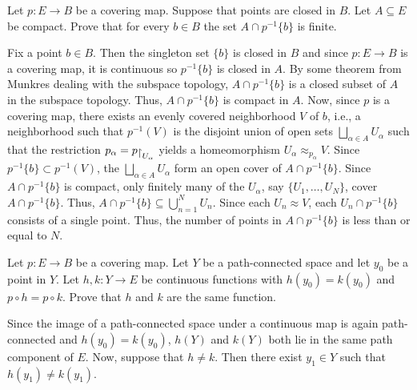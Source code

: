 \begin{problem}
  Let \(p\colon E\to B\) be a covering map. Suppose that points are closed
  in \(B\). Let \(A\subseteq E\) be compact. Prove that for every
  \(b\in B\) the set \(A\cap p^{-1}\{b\}\) is finite.
\end{problem}
\begin{solution}
  Fix a point \(b\in B\). Then the singleton set \(\{b\}\) is closed in
  \(B\) and since \(p\colon E\to B\) is a covering map, it is continuous so
  \(p^{-1}\{b\}\) is closed in \(A\). By some theorem from Munkres dealing
  with the subspace topology, \(A\cap p^{-1}\{b\}\) is a closed subset of
  \(A\) in the subspace topology. Thus, \(A\cap p^{-1}\{b\}\) is compact in
  \(A\). Now, since \(p\) is a covering map, there exists an evenly covered
  neighborhood \(V\) of \(b\), i.e., a neighborhood such that \(p^{-1}(V)\)
  is the disjoint union of open sets \(\bigsqcup_{\alpha\in A} U_\alpha\)
  such that the restriction \(p_\alpha=p\restrict{U_\alpha}\) yields a
  homeomorphism \(U_\alpha\approx_{p_\alpha} V\). Since
  \(p^{-1}\{b\}\subset p^{-1}(V)\), the \(\bigsqcup_{\alpha\in A}U_\alpha\)
  form an open cover of \(A\cap p^{-1}\{b\}\). Since \(A\cap p^{-1}\{b\}\)
  is compact, only finitely many of the \(U_\alpha\), say
  \(\{U_1,\dotsc,U_N\}\), cover \(A\cap p^{-1}\{b\}\). Thus,
  \(A\cap p^{-1}\{b\}\subseteq\bigcup_{n=1}^N U_n\). Since each
  \(U_n\approx V\), each \(U_n\cap p^{-1}\{b\}\) consists of a single
  point. Thus, the number of points in \(A\cap p^{-1}\{b\}\) is less than
  or equal to \(N\).
\end{solution}

\begin{problem}
  Let \(p\colon E\to B\) be a covering map. Let \(Y\) be a path-connected
  space and let \(y_0\) be a point in \(Y\). Let \(h,k\colon Y\to E\) be
  continuous functions with \(h(y_0)=k(y_0)\) and \(p\circ h=p\circ
  k\). Prove that \(h\) and \(k\) are the same function.
\end{problem}
\begin{solution}
  Since the image of a path-connected space under a continuous map is again
  path-connected and \(h(y_0)=k(y_0)\), \(h(Y)\) and \(k(Y)\) both lie in
  the same path component of \(E\). Now, suppose that \(h\neq k\). Then
  there exist \(y_1\in Y\) such that \(h(y_1)\neq k(y_1)\).
\end{solution}

